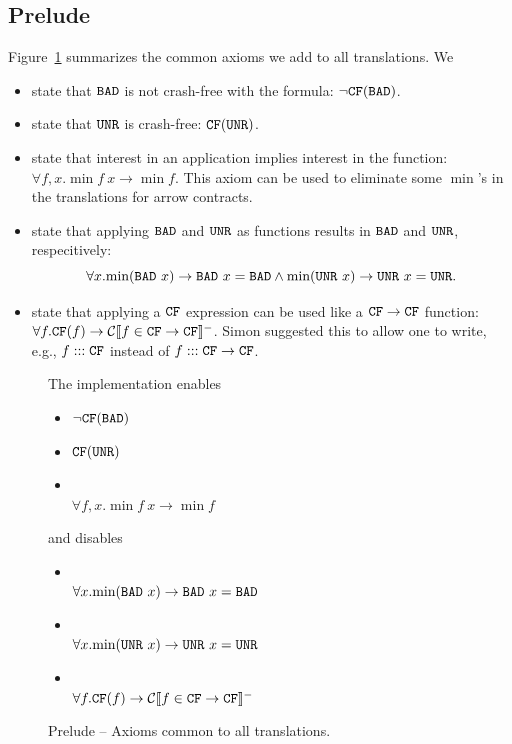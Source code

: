 \documentclass[preprint]{sigplanconf}
\begin{document}
\subsection{Prelude}
Figure~\ref{fig:prelude} summarizes the common axioms we add to all
translations.  We 
\begin{itemize}
  \item state that $\texttt{BAD}$ is not crash-free with the formula:
$\lnot \texttt{CF}(\texttt{BAD})$.

  \item state that $\texttt{UNR}$ is crash-free: $\texttt{CF}(\texttt{UNR})$.

  \item \designChoice state that interest in an application implies
  interest in the function: $\forall f,x. \min{f ~x} \to \min{f}$.  This axiom can
  be used to eliminate some $\min{}$'s in the translations for arrow contracts.

  \item \designChoice state that applying $\texttt{BAD}$ and $\texttt{UNR}$ as functions
  results in $\texttt{BAD}$ and $\texttt{UNR}$, respecitively: \[
  \forall x. \mbox{min}(\texttt{BAD} ~x) \to \texttt{BAD} ~x = \texttt{BAD} \land \mbox{min}(\texttt{UNR} ~x) \to \texttt{UNR} ~x = \texttt{UNR}.
  \]

  \item \designChoice state that applying a $\texttt{CF}$ expression can be used like a
  $\texttt{CF} \to \texttt{CF}$ function: $\forall f. \texttt{CF}(f) \to \mathcal{C} \llbracket f \in \texttt{CF} \to \texttt{CF} \rrbracket^-$.
  Simon suggested this to allow one to write, e.g., $f ::: \texttt{CF}$ instead of 
  $f ::: \texttt{CF} \to \texttt{CF}$.
\end{itemize}

\begin{figure}\label{fig:prelude}
  The implementation enables
  \begin{itemize}
    \item $\lnot \texttt{CF}(\texttt{BAD})$
    \item $\texttt{CF}(\texttt{UNR})$
    \item \designChoice\\ $\forall f,x. \min{f ~x} \to \min{f}$
  \end{itemize}
  and disables
  \begin{itemize}
    \item \designChoice\\ $\forall x. \mbox{min}(\texttt{BAD} ~x) \to \texttt{BAD} ~x = \texttt{BAD}$ 
    \item \designChoice\\ $\forall x. \mbox{min}(\texttt{UNR} ~x) \to \texttt{UNR} ~x = \texttt{UNR}$
    \item \designChoice\\ $\forall f. \texttt{CF}(f) \to \mathcal{C} \llbracket f \in \texttt{CF} \to \texttt{CF} \rrbracket^-$
  \end{itemize}
  \caption{Prelude -- Axioms common to all translations.}
\end{figure}
\end{document}

